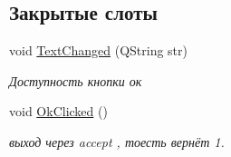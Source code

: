 \subsection*{Закрытые слоты}
\begin{DoxyCompactItemize}
\item 
void \hyperlink{class_my_new_curve_ad2f0b68e3ac43c6046261ad41059edae}{Text\+Changed} (Q\+String str)\hypertarget{class_my_new_curve_ad2f0b68e3ac43c6046261ad41059edae}{}\label{class_my_new_curve_ad2f0b68e3ac43c6046261ad41059edae}

\begin{DoxyCompactList}\small\item\em Доступность кнопки ок \end{DoxyCompactList}\item 
void \hyperlink{class_my_new_curve_a220756368617b53ca4c70237ae018a08}{Ok\+Clicked} ()\hypertarget{class_my_new_curve_a220756368617b53ca4c70237ae018a08}{}\label{class_my_new_curve_a220756368617b53ca4c70237ae018a08}

\begin{DoxyCompactList}\small\item\em выход через accept , тоесть вернёт 1. \end{DoxyCompactList}\end{DoxyCompactItemize}
